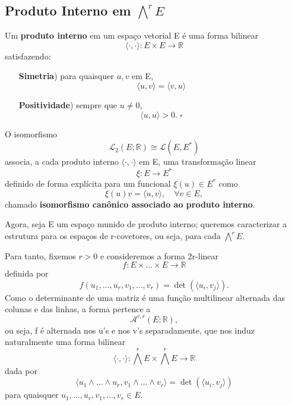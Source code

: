 \documentclass[../differential_forms.tex]{subfiles}
\begin{document}
\subsection{Produto Interno em \(\bigwedge^{r}E\)}
\begin{def*}
	Um \textbf{produto interno} em um espaço vetorial E é uma forma bilinear
	\[
		\langle \cdot , \cdot  \rangle:E\times E\rightarrow \mathbb{R}
	\]
	satisfazendo:
	\begin{itemize}
		\item[\textbf{Simetria})] para quaisquer \(u, v\) em E,
		      \[
			      \langle u, v \rangle = \langle v, u \rangle
		      \]
		\item[\textbf{Positividade})] sempre que \(u\neq 0\),
		      \[
			      \langle u, u \rangle > 0. \;\square
		      \]
	\end{itemize}
\end{def*}
O isomorfismo
\[
	\mathcal{L}_2(E; \mathbb{R})\cong  \mathcal{L}(E, E^{*})
\]
associa, a cada produto interno \(\langle \cdot , \cdot  \rangle\) em E, uma transformação linear
\[
	\xi :E\rightarrow E^{*}
\]
definido de forma explícita para um funcional \(\xi (u)\in E^{*}\) como
\[
	\xi (u)v = \langle u, v \rangle,\quad \forall v\in E,
\]
chamado \textbf{isomorfismo canônico associado ao produto interno}.

Agora, seja E um espaço munido de produto interno; queremos caracterizar a estrutura para os espaços de r-covetores, ou seja, para cada \(\bigwedge^{r}E\).

Para tanto, fixemos \(r>0\) e consideremos a forma 2r-linear
\[
	f:E\times \dotsc \times E\rightarrow \mathbb{R}
\]
definida por
\[
	f(u_1, \dotsc , u_r, v_1, \dotsc , v_r) = \det{(\langle u_{i}, v_{j} \rangle)}.
\]
Como o determinante de uma matriz é uma função multilinear alternada das colunas e das linhas, a forma pertence a
\[
	\mathcal{A}^{r, r}(E; \mathbb{R}),
\]
ou seja, f é alternada nos u's e nos v's separadamente, que nos induz naturalmente uma forma bilinear
\[
	\langle \cdot , \cdot  \rangle:\bigwedge^{r}E \times \bigwedge^{r}E\rightarrow \mathbb{R}
\]
dada por
\[
	\langle u_1\wedge \dotsc \wedge u_r, v_1\wedge \dotsc \wedge v_r \rangle = \det{(\langle u_{i}, v_{j} \rangle)}
\]
para quaisquer \(u_1, \dotsc , u_r, v_1, \dotsc , v_r\in E\).
\end{document}
